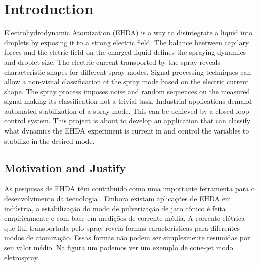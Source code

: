 \chapter{Introduction}
\label{chap:intro} %

Electrohydrodynamic Atomization (EHDA) is a way to disintegrate a liquid into droplets by exposing it to a strong electric field.\cite{prunet}
The balance beetween capilary forces and the eletric field on the charged liquid defines the spraying dynamics and droplet size.
The electric current transported by the spray reveals characteristic shapes for different spray modes.
Signal processing techniques can allow a non-visual classification of the spray mode based on the electric current shape.\cite{Sjaaks}
The spray process imposes noise and random sequences on the measured signal making its classification not a trivial task. 
Industrial applications demand automated stabilization of a spray mode. 
This can be achieved by a closed-loop control system. 
This project is about to develop an application that can classify what dynamics the EHDA experiment is current in and control the variables to stabilize in the desired mode. 


\section{Motivation and Justify}
\label{sec:motivacao}

As pesquisas de EHDA têm contribuído como uma importante ferramenta para
o desenvolvimento da tecnologia . Embora existam aplicações de EHDA em
indústria, a estabilização do modo de pulverização de jato cônico é feita empiricamente e com base em medições de corrente média.
A corrente elétrica que flui transportada pelo spray revela formas características para diferentes modos de atomização.
Essas formas não podem ser simplesmente resumidas por seu valor médio. Na figura um podemos ver um exemplo de cone-jet
modo eletrospray.


